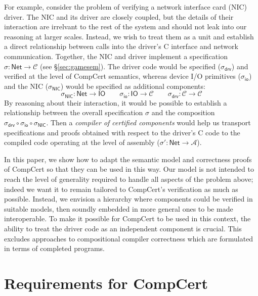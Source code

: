 \documentclass[draft,11pt]{report}
\newcommand{\kw}[1]{\ensuremath{ \mathsf{#1} }}
\begin{document}
For example,
consider the problem of verifying
a network interface card (NIC) driver.
The NIC and its driver are closely coupled,
but the details of their interaction
are irrelvant to the rest of the system
and should not leak into our reasoning at larger scales.
Instead,
we wish to treat them as a unit
and establish a direct relationship between calls into
the driver's C interface and network communication.
Together, the NIC and driver implement
a specification $\sigma :
\kw{Net} \rightarrow \mathcal{C}$ (see \S\ref{sec:gamesem}). %
The driver code would be specified
($\sigma_\kw{drv}$)
and verified
at the level of CompCert semantics,
whereas device I/O primitives
($\sigma_\kw{io}$)
and the NIC
($\sigma_\kw{NIC}$)
would be specified as additional components:
\[
  \sigma_\kw{NIC} : \kw{Net} \rightarrow \kw{IO}
  \qquad
  \sigma_\kw{io} : \kw{IO} \rightarrow \mathcal{C}
  \qquad
  \sigma_\kw{drv} : \mathcal{C} \rightarrow \mathcal{C}
\]
By reasoning about their interaction,
it would be possible to establish a relationship between
the overall specification $\sigma$ and
the composition
$\sigma_\kw{drv} \circ \sigma_\kw{io} \circ \sigma_\kw{NIC}$.
Then a \emph{compiler of certified components}
would help us transport specifications and proofs
obtained with respect to the driver's C code
to the compiled code operating at the level of assembly
($\sigma' : \kw{Net} \rightarrow \mathcal{A}$).

In this paper, we show how to adapt
the semantic model and correctness proofs of CompCert
so that they can be used in this way.
Our model is not intended to reach the level of generality
required to handle all aspects of the problem above;
indeed we want it to remain tailored to CompCert's
verification as much as possible.
Instead, we envision a hierarchy
where components could be verified in suitable models,
then soundly embedded in more general ones
to be made interoperable.
To make it possible for CompCert to be used in this context,
the ability to treat the driver code as an
independent component is crucial.
This excludes approaches to
compositional compiler correctness
which are formulated in terms of completed programs.


\section{Requirements for CompCert} \label{sec:compcertreq} %
\end{document}
